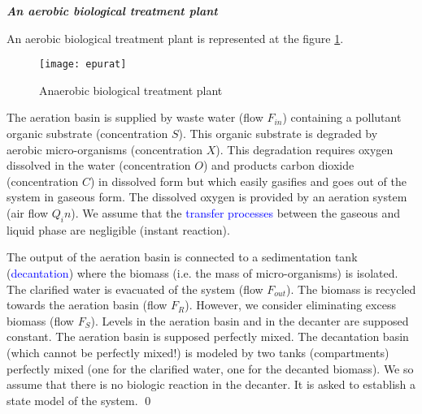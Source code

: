 \begin{exercice}{\bf \em An aerobic biological treatment plant}

An aerobic biological treatment plant is represented at the figure \ref{Fig:epurat}.
\begin{figure}[htbp] 
   \centering
   \texttt{[image: epurat]} 
   \caption{Anaerobic biological treatment plant}
   \label{Fig:epurat}
\end{figure}
The aeration basin is supplied by waste water (flow $F_{in}$) containing a pollutant organic substrate (concentration $S$). This organic substrate is degraded by aerobic micro-organisms (concentration $X$). This degradation requires oxygen dissolved in the water (concentration $O$) and products carbon dioxide (concentration $C$) in dissolved form but which easily gasifies and goes out of the system in gaseous form. The dissolved oxygen is provided by an aeration system (air flow $Q_in$). We assume that the \textcolor{blue}{transfer processes} between the gaseous and liquid phase are negligible (instant reaction). 

The output of the aeration basin is connected to a sedimentation tank (\textcolor{blue}{decantation}) where the biomass (i.e. the mass of micro-organisms) is isolated. The clarified water is evacuated of the system (flow $F_{out}$). The biomass is recycled towards the aeration basin (flow $F_R$). However, we consider eliminating excess biomass (flow $F_S$). Levels in the aeration basin and in the decanter are supposed constant. The aeration basin is supposed perfectly mixed. The decantation basin (which cannot be perfectly mixed!) is modeled by two tanks (compartments) perfectly mixed (one for the clarified water, one for the decanted biomass). We so assume that there is no biologic reaction in the decanter. It is asked to establish a state model of the system.  \qed
\end{exercice}
\vv

